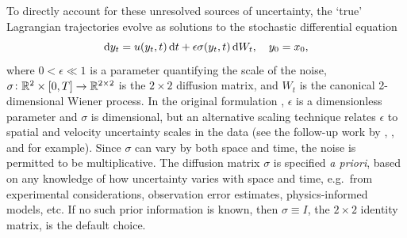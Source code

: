 To directly account for these unresolved sources of uncertainty, the `true' Lagrangian trajectories evolve as solutions to the stochastic differential equation
\begin{equation}
	\sde{y_t}{u\!\left(y_t, t\right)}{\epsilon\sigma\!\left(y_t, t\right)}, \quad y_0 = x_0
	\label{eqn:s2_sde},
\end{equation}
where \(0 < \epsilon \ll 1\) is a parameter quantifying the scale of the noise, \(\sigma\colon	\mathbb{R}^2\times[0,T] \to \mathbb{R}^{2\times 2}\) is the \(2\times 2\) diffusion matrix, and \(W_t\) is the canonical 2-dimensional Wiener process.
In the original formulation \citep{Balasuriya_2020_StochasticSensitivityComputable}, \(\epsilon\) is a dimensionless parameter and \(\sigma\) is dimensional, but an alternative scaling technique relates \(\epsilon\) to spatial and velocity uncertainty scales in the data (see the follow-up work by \citet{Balasuriya_2020_UncertaintyFinitetimeLyapunov}, \citet{FangEtAl_2020_DisentanglingResolutionPrecision}, and \citet{BadzaEtAl_2023_HowSensitiveAre} for example).
Since \(\sigma\) can vary by both space and time, the noise is permitted to be multiplicative.
The diffusion matrix \(\sigma\) is specified \emph{a priori}, based on any knowledge of how uncertainty varies with space and time, e.g.\ from experimental considerations, observation error estimates, physics-informed models, etc.
If no such prior information is known, then \(\sigma \equiv I\), the \(2 \times 2\) identity matrix, is the default choice.

